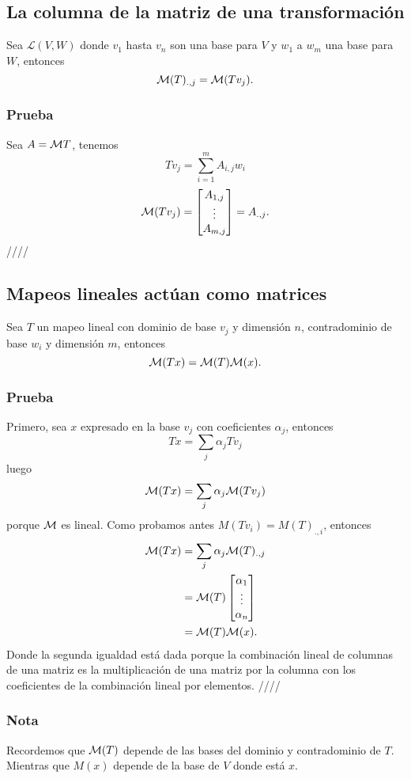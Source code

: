 \documentclass{article}
\begin{document}
\subsection{La columna de la matriz de una transformación}
Sea $\mathcal{L}(V,W)$ donde $v_1$ hasta $v_n$ son una base para $V$
y $w_1$ a $w_m$ una base para $W$, entonces
$$\mathcal{M}(T)_{.,j} = \mathcal{M} (Tv_j).$$
\subsubsection*{Prueba}
Sea $A=\mathcal{M} T$, tenemos
$$Tv_j = \sum^m_{i=1}A_{i,j} w_i$$
$$\mathcal{M}(Tv_j) = \begin{bmatrix}
    A_{1,j}\\
    \vdots\\
    A_{m,j}
\end{bmatrix}
=
A_{.,j}.$$
\hfill ////

\subsection{Mapeos lineales actúan como matrices}
Sea $T$ un mapeo lineal con dominio de base $v_j$ y dimensión $n$,
contradominio de base $w_i$ y dimensión $m$, entonces
$$\mathcal{M} (Tx) = \mathcal{M} (T)\mathcal{M} (x).$$
\subsubsection*{Prueba}
Primero, sea $x$ expresado en la base $v_j$ con coeficientes $\alpha_j$,
entonces $$Tx =\sum_j\alpha_j Tv_j$$
luego $$\mathcal{M}(Tx)=\sum_j\alpha_j\mathcal{M}(Tv_j)$$
porque $\mathcal{M}$ es lineal. Como probamos antes
$M(Tv_i) = M(T)_{.,i}$, entonces
\begin{align*}
    \mathcal{M}(Tx) &= \sum_j\alpha_j\mathcal{M}(T)_{.,j}\\
    &= \mathcal{M}(T) \begin{bmatrix}
        \alpha_1 \\
        \vdots \\
        \alpha_n
    \end{bmatrix}\\
    &= \mathcal{M}(T)\mathcal{M}(x).
\end{align*}
Donde la segunda igualdad está dada porque la combinación
lineal de columnas de una matriz es la multiplicación de una matriz
por la columna con los coeficientes de la combinación lineal por 
elementos. \hfill ////

\subsubsection{Nota}
Recordemos que $\mathcal{M}(T)$ depende de las bases del dominio y 
contradominio de $T$. Mientras que $M(x)$ depende de la base
de $V$ donde está $x$.
\end{document}
